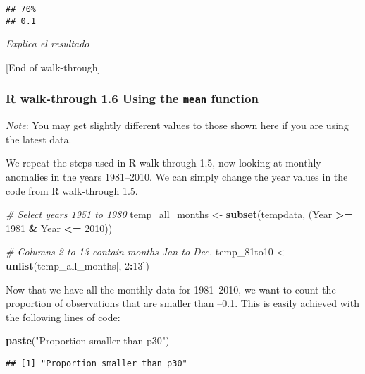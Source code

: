 \documentclass[
]{article}
\newenvironment{Shaded}{\begin{snugshade}}{\end{snugshade}}
\newcommand{\CommentTok}[1]{\textcolor[rgb]{0.56,0.35,0.01}{\textit{#1}}}
\newcommand{\DecValTok}[1]{\textcolor[rgb]{0.00,0.00,0.81}{#1}}
\newcommand{\FunctionTok}[1]{\textcolor[rgb]{0.13,0.29,0.53}{\textbf{#1}}}
\newcommand{\NormalTok}[1]{#1}
\newcommand{\OtherTok}[1]{\textcolor[rgb]{0.56,0.35,0.01}{#1}}
\newcommand{\SpecialCharTok}[1]{\textcolor[rgb]{0.81,0.36,0.00}{\textbf{#1}}}
\newcommand{\StringTok}[1]{\textcolor[rgb]{0.31,0.60,0.02}{#1}}
\begin{document}
\begin{verbatim}
## 70% 
## 0.1
\end{verbatim}

\emph{Explica el resultado}

{[}End of walk-through{]}

\subsubsection{\texorpdfstring{R walk-through 1.6 Using the
\texttt{mean}
function}{R walk-through 1.6 Using the mean function}}\label{r-walk-through-1.6-using-the-mean-function}

\emph{Note}: You may get slightly different values to those shown here
if you are using the latest data.

We repeat the steps used in R walk-through 1.5, now looking at monthly
anomalies in the years 1981--2010. We can simply change the year values
in the code from R walk-through 1.5.

\begin{Shaded}
\begin{Highlighting}[]
\CommentTok{\# Select years 1951 to 1980}
\NormalTok{temp\_all\_months }\OtherTok{\textless{}{-}} \FunctionTok{subset}\NormalTok{(tempdata, }
\NormalTok{  (Year }\SpecialCharTok{\textgreater{}=} \DecValTok{1981} \SpecialCharTok{\&}\NormalTok{ Year }\SpecialCharTok{\textless{}=} \DecValTok{2010}\NormalTok{))}
                   
\CommentTok{\# Columns 2 to 13 contain months Jan to Dec.}
\NormalTok{temp\_81to10 }\OtherTok{\textless{}{-}} \FunctionTok{unlist}\NormalTok{(temp\_all\_months[, }\DecValTok{2}\SpecialCharTok{:}\DecValTok{13}\NormalTok{])}
\end{Highlighting}
\end{Shaded}

Now that we have all the monthly data for 1981--2010, we want to count
the proportion of observations that are smaller than --0.1. This is
easily achieved with the following lines of code:

\begin{Shaded}
\begin{Highlighting}[]
\FunctionTok{paste}\NormalTok{(}\StringTok{"Proportion smaller than p30"}\NormalTok{)}
\end{Highlighting}
\end{Shaded}

\begin{verbatim}
## [1] "Proportion smaller than p30"
\end{verbatim}
\end{document}
